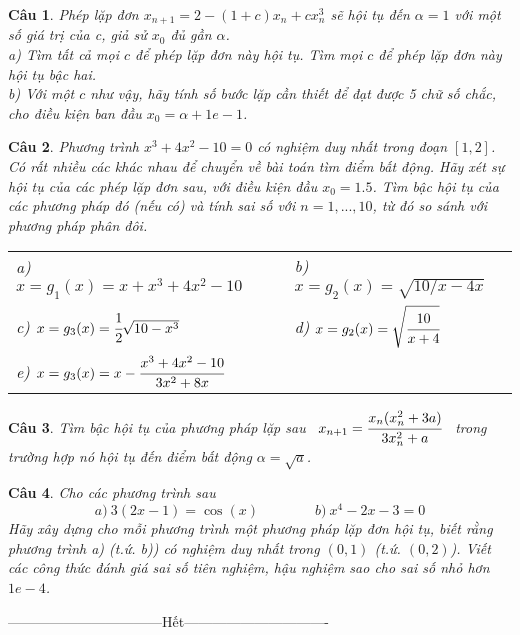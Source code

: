 \documentclass[11pt]{article}
\newtheorem{bt}{Câu}
\begin{document}
\begin{bt} %
Phép lặp đơn $x_{n+1}=2-(1+c)x_n+cx_n^3$ sẽ hội tụ đến $\alpha=1$ với một số giá trị của c, giả sử $x_0$ đủ gần $\alpha$. \\
a) Tìm tất cả mọi $c$ để phép lặp đơn này hội tụ. Tìm mọi $c$ để phép lặp đơn này hội tụ bậc hai. \\
b) Với một $c$ như vậy, hãy tính số bước lặp cần thiết để đạt được 5 chữ số chắc, cho điều kiện ban đầu $x_0=\alpha + 1e-1$.  
\end{bt}

\begin{bt} 
Phương trình $x^3+4x^2-10=0$ có nghiệm duy nhất trong đoạn $[1, 2]$. Có rất nhiều các khác nhau để chuyển về bài toán tìm điểm bất động. Hãy xét sự hội tụ của các phép lặp đơn sau, với điều kiện đầu $x_0=1.5$. Tìm bậc hội tụ của các phương pháp đó (nếu có) và tính sai số với $n=1,...,10$, từ đó so sánh với phương pháp phân đôi.\\
%
\begin{tabular}{lll}
a) $x=g_1(x)=x+x^3+4x^2-10$	&  & b) $x=g_2(x) = \sqrt{10/x - 4x}$ \\ 
c) $x=g_3(x)=\cfrac{1}{2}\sqrt{10-x^3}$	&  &  d) $x=g_2(x) = \sqrt{\cfrac{10}{x+4}}$ \\ 
e) $x=g_3(x)=x-\cfrac{x^3+4x^2-10}{3x^2+8x}$	&  &  \\ 
\end{tabular} 
%	
\end{bt}

\begin{bt} %
Tìm bậc hội tụ của phương pháp lặp sau \ $x_{n+1}=\cfrac{x_n(x_n^2+3a)}{3x_n^2+a}$ \ trong trường hợp nó hội tụ đến điểm bất động $\alpha = \sqrt{a}$.
\end{bt}

\begin{bt}
Cho các phương trình sau
%
\[ a) \ 3(2x-1)= \cos(x) \qquad \qquad b) \ x^4-2x-3=0  \]
%
Hãy xây dựng cho mỗi phương trình một phương pháp lặp đơn hội tụ, biết rằng phương trình a) (t.ứ. b)) có nghiệm duy nhất trong $(0,1)$ (t.ứ. $(0,2)$). Viết các công thức đánh giá sai số tiên nghiệm, hậu nghiệm sao cho sai số nhỏ hơn $1e-4$.
\end{bt}

\centerline{———————————Hết——————————-}
\end{document}
